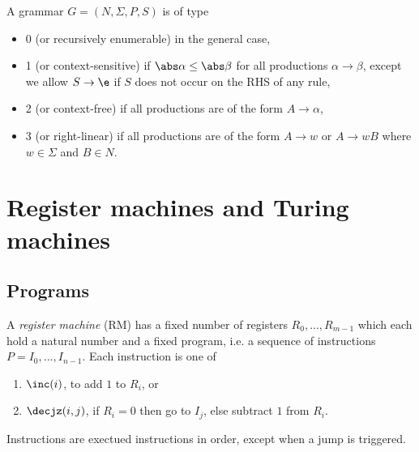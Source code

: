 \documentclass{article}
\begin{document}
\begin{definition*}
	A grammar $G=(N,\Sigma,P,S)$ is of type
	\begin{itemize}
		\item 0 (or recursively enumerable) in the general case,
		\item 1 (or context-sensitive) if $\abs\alpha \leq \abs\beta$ for all
		      productions $\alpha\to\beta$, except we allow $S\to\e$ if $S$ does
		      not occur on the RHS of any rule,
		\item 2 (or context-free) if all productions are of the form $A\to\alpha$,
		\item 3 (or right-linear) if all productions are of the form $A\to w$ or
		      $A\to wB$ where $w\in\Sigma$ and $B\in N$.
	\end{itemize}
\end{definition*}

\section{Register machines and Turing machines}

\subsection{Programs}

\begin{definition*}[RM]
	A \emph{register machine} (RM) has a fixed number of registers $R_0,...,R_{m-1}$
	which each hold a natural number and a fixed program, i.e. a sequence of
	instructions $P=I_0,...,I_{n-1}$. Each instruction is one of
	\begin{enumerate}
		\item $\inc(i)$, to add $1$ to $R_i$, or
		\item $\decjz(i,j)$, if $R_i=0$ then go to $I_j$, else subtract $1$ from $R_i$.
	\end{enumerate}
	Instructions are exectued instructions in order, except when
	a jump is triggered.
\end{definition*}
\end{document}
